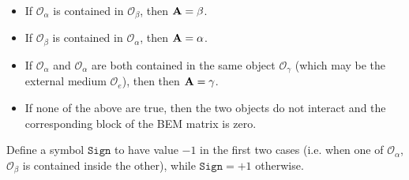\documentclass[letterpaper]{article}
\begin{document}
\begin{itemize}
 \item If $\mathcal{O}_\alpha$ is contained in $\mathcal{O}_\beta$, 
       then $\mathbf{A}=\beta$.
 \item If $\mathcal{O}_\beta$ is contained in $\mathcal{O}_\alpha$, 
       then $\mathbf{A}=\alpha$.
 \item If $\mathcal{O}_\alpha$ and $\mathcal{O}_\alpha$ are both
       contained in the same object $\mathcal{O}_\gamma$ (which may
       be the external medium $\mathcal{O}_e$), then  
       then $\mathbf{A}=\gamma$.
 \item If none of the above are true, then the two objects do not
       interact and the corresponding block of the BEM matrix is
       zero.
\end{itemize}

Define a symbol $\texttt{Sign}$ to have value $-1$ in the first
two cases (i.e. when one of $\mathcal{O}_\alpha$, $\mathcal{O}_\beta$
is contained inside the other), while $\texttt{Sign}=+1$ otherwise.
\end{document}
